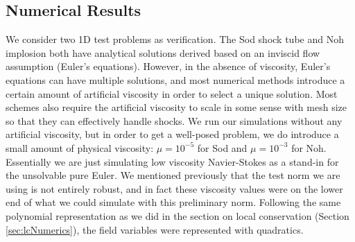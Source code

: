 \documentclass[Dissertation.tex]{subfiles}
\begin{document}
%                                                                                    
%                                                                                    
% 
\subsection{Numerical Results}
We consider two 1D test problems as verification.
The Sod shock tube and Noh implosion both have analytical solutions derived based on an inviscid flow assumption (Euler's equations).
However, in the absence of viscosity, Euler's equations can have multiple solutions, and most numerical methods introduce a certain amount of
artificial viscosity in order to select a unique solution.
Most schemes also require the artificial viscosity to scale in some sense with mesh size so that they can effectively handle shocks.
We run our simulations without any artificial viscosity, but in order to get a well-posed problem, we do introduce a small amount of physical
viscosity: $\mu=10^{-5}$ for Sod and $\mu=10^{-3}$ for Noh.
Essentially we are just simulating low viscosity Navier-Stokes as a stand-in for the unsolvable pure Euler.
We mentioned previously that the test norm we are using is not entirely robust, and in fact these viscosity values were on the lower end of what we
could simulate with this preliminary norm.
Following the same polynomial representation as we did in the section on local conservation (Section \ref{sec:lcNumerics}), the field variables were represented with quadratics.
\end{document}
